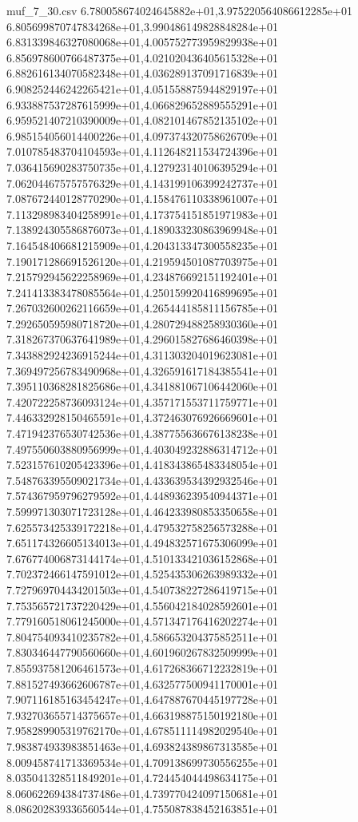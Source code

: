 \begin{filecontents*}{muf_7_30.csv}
6.780058674024645882e+01,3.975220564086612285e+01
6.805699870747834268e+01,3.990486149828848284e+01
6.831339846327080068e+01,4.005752773959829938e+01
6.856978600766487375e+01,4.021020436405615328e+01
6.882616134070582348e+01,4.036289137091716839e+01
6.908252446242265421e+01,4.051558875944829197e+01
6.933887537287615999e+01,4.066829652889555291e+01
6.959521407210390009e+01,4.082101467852135102e+01
6.985154056014400226e+01,4.097374320758626709e+01
7.010785483704104593e+01,4.112648211534724396e+01
7.036415690283750735e+01,4.127923140106395294e+01
7.062044675757576329e+01,4.143199106399242737e+01
7.087672440128770290e+01,4.158476110338961007e+01
7.113298983404258991e+01,4.173754151851971983e+01
7.138924305586876073e+01,4.189033230863969948e+01
7.164548406681215909e+01,4.204313347300558235e+01
7.190171286691526120e+01,4.219594501087703975e+01
7.215792945622258969e+01,4.234876692151192401e+01
7.241413383478085564e+01,4.250159920416899695e+01
7.267032600262116659e+01,4.265444185811156785e+01
7.292650595980718720e+01,4.280729488258930360e+01
7.318267370637641989e+01,4.296015827686460398e+01
7.343882924236915244e+01,4.311303204019623081e+01
7.369497256783490968e+01,4.326591617184385541e+01
7.395110368281825686e+01,4.341881067106442060e+01
7.420722258736093124e+01,4.357171553711759771e+01
7.446332928150465591e+01,4.372463076926669601e+01
7.471942376530742536e+01,4.387755636676138238e+01
7.497550603880956999e+01,4.403049232886314712e+01
7.523157610205423396e+01,4.418343865483348054e+01
7.548763395509021734e+01,4.433639534392932546e+01
7.574367959796279592e+01,4.448936239540944371e+01
7.599971303071723128e+01,4.464233980853350658e+01
7.625573425339172218e+01,4.479532758256573288e+01
7.651174326605134013e+01,4.494832571675306099e+01
7.676774006873144174e+01,4.510133421036152868e+01
7.702372466147591012e+01,4.525435306263989332e+01
7.727969704434201503e+01,4.540738227286419715e+01
7.753565721737220429e+01,4.556042184028592601e+01
7.779160518061245000e+01,4.571347176416202274e+01
7.804754093410235782e+01,4.586653204375852511e+01
7.830346447790560660e+01,4.601960267832509999e+01
7.855937581206461573e+01,4.617268366712232819e+01
7.881527493662606787e+01,4.632577500941170001e+01
7.907116185163454247e+01,4.647887670445197728e+01
7.932703655714375657e+01,4.663198875150192180e+01
7.958289905319762170e+01,4.678511114982029540e+01
7.983874933983851463e+01,4.693824389867313585e+01
8.009458741713369534e+01,4.709138699730556255e+01
8.035041328511849201e+01,4.724454044498634175e+01
8.060622694384737486e+01,4.739770424097150681e+01
8.086202839336560544e+01,4.755087838452163851e+01

\end{filecontents*}
